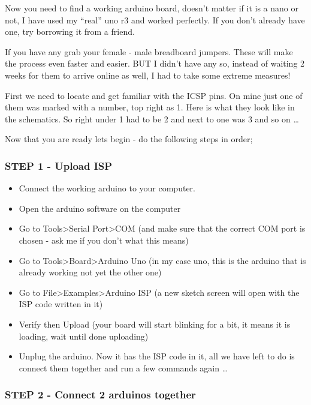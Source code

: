 Now you need to find a working arduino board, doesn't matter if it is a nano or not, I have used my ``real'' uno r3 and worked perfectly. If you don't already have one, try borrowing it from a friend.



If you have any grab your female - male breadboard jumpers. These will make the process even faster and easier. BUT I didn't have any so, instead of waiting 2 weeks for them to arrive online as well, I had to take some extreme measures!



First we need to locate and get familiar with the ICSP pins. On mine just one of them was marked with a number, top right as 1. Here is what they look like in the schematics. So right under 1 had to be 2 and next to one was 3 and so on \ldots



Now that you are ready lets begin - do the following steps in order;


\subsubsection{STEP 1 - Upload ISP}

\begin{itemize}
  \item Connect the working arduino to your computer.
  \item Open the arduino software on the computer
  \item Go to Tools>Serial Port>COM (and make sure that the correct COM port is chosen - ask me if you don't what this means)
  \item  Go to Tools>Board>Arduino Uno (in my case uno, this is the arduino that is already working not yet the other one)
  \item Go to File>Examples>Arduino ISP (a new sketch screen will open with the ISP code written in it)
  \item Verify then Upload (your board will start blinking for a bit, it means it is loading, wait until done uploading)
  \item Unplug the arduino. Now it has the ISP code in it, all we have left to do is connect them together and run a few commands again \ldots
\end{itemize}

\subsubsection{STEP 2 - Connect 2 arduinos together}

